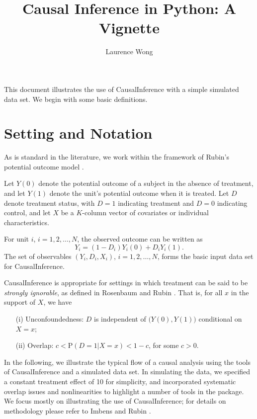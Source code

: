 \documentclass[12pt]{article}
\renewcommand{\P}{\mathrm{P}}
\theoremstyle{definition}
\theoremstyle{definition}
\theoremstyle{definition}
\theoremstyle{remark}
\begin{document}

\title{Causal Inference in Python: A Vignette}
\author{Laurence Wong}
\maketitle

This document illustrates the use of CausalInference with a simple simulated data set. We begin with some basic definitions.

\section{Setting and Notation}

As is standard in the literature, we work within the framework of Rubin's potential outcome model \cite{Rubin.1974}.

Let $Y(0)$ denote the potential outcome of a subject in the absence of treatment, and let $Y(1)$ denote the unit's potential outcome when it is treated. Let $D$ denote treatment status, with $D=1$ indicating treatment and $D=0$ indicating control, and let $X$ be a $K$-column vector of covariates or individual characteristics.

For unit $i$, $i=1,2,\ldots,N$, the observed outcome can be written as
\[Y_i = (1-D_i) Y_i(0) + D_i Y_i(1).\]
The set of observables $(Y_i, D_i, X_i)$, $i=1,2,\ldots,N$, forms the basic input data set for CausalInference.

CausalInference is appropriate for settings in which treatment can be said to be \textit{strongly ignorable}, as defined in Rosenbaum and Rubin \citeyear{RosenbaumRubin.1983}. That is, for all $x$ in the support of $X$, we have
\begin{itemize}
\item[(i)] Unconfoundedness: $D$ is independent of $\big(Y(0), Y(1)\big)$ conditional on $X=x$;
\item[(ii)] Overlap: $c < \P(D=1|X=x) < 1-c$, for some $c>0$.
\end{itemize}

In the following, we illustrate the typical flow of a causal analysis using the tools of CausalInference and a simulated data set. In simulating the data, we specified a constant treatment effect of 10 for simplicity, and incorporated systematic overlap issues and nonlinearities to highlight a number of tools in the package. We focus mostly on illustrating the use of CausalInference; for details on methodology please refer to Imbens and Rubin \citeyear{ImbensRubin.2015}.
\end{document}
